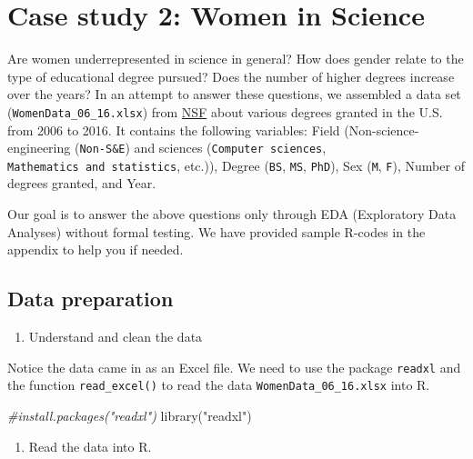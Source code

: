 \documentclass[
]{article}
\newenvironment{Shaded}{\begin{snugshade}}{\end{snugshade}}
\newcommand{\CommentTok}[1]{\textcolor[rgb]{0.56,0.35,0.01}{\textit{#1}}}
\newcommand{\FunctionTok}[1]{\textcolor[rgb]{0.00,0.00,0.00}{#1}}
\newcommand{\NormalTok}[1]{#1}
\newcommand{\StringTok}[1]{\textcolor[rgb]{0.31,0.60,0.02}{#1}}
\providecommand{\tightlist}{%
  \setlength{\itemsep}{0pt}\setlength{\parskip}{0pt}}
\begin{document}
\hypertarget{case-study-2-women-in-science}{%
\section{Case study 2: Women in
Science}\label{case-study-2-women-in-science}}

Are women underrepresented in science in general? How does gender relate
to the type of educational degree pursued? Does the number of higher
degrees increase over the years? In an attempt to answer these
questions, we assembled a data set (\texttt{WomenData\_06\_16.xlsx})
from
\href{https://ncses.nsf.gov/pubs/nsf19304/digest/field-of-degree-women}{NSF}
about various degrees granted in the U.S. from 2006 to 2016. It contains
the following variables: Field (Non-science-engineering
(\texttt{Non-S\&E}) and sciences (\texttt{Computer\ sciences},
\texttt{Mathematics\ and\ statistics}, etc.)), Degree (\texttt{BS},
\texttt{MS}, \texttt{PhD}), Sex (\texttt{M}, \texttt{F}), Number of
degrees granted, and Year.

Our goal is to answer the above questions only through EDA (Exploratory
Data Analyses) without formal testing. We have provided sample R-codes
in the appendix to help you if needed.

\hypertarget{data-preparation-1}{%
\subsection{Data preparation}\label{data-preparation-1}}

\begin{enumerate}
\def\labelenumi{\arabic{enumi}.}
\tightlist
\item
  Understand and clean the data
\end{enumerate}

Notice the data came in as an Excel file. We need to use the package
\texttt{readxl} and the function \texttt{read\_excel()} to read the data
\texttt{WomenData\_06\_16.xlsx} into R.

\begin{Shaded}
\begin{Highlighting}[]
\CommentTok{\#install.packages("readxl")}
\FunctionTok{library}\NormalTok{(}\StringTok{"readxl"}\NormalTok{)}
\end{Highlighting}
\end{Shaded}

\begin{enumerate}
\def\labelenumi{\roman{enumi}.}
\tightlist
\item
  Read the data into R.
\end{enumerate}
\end{document}
